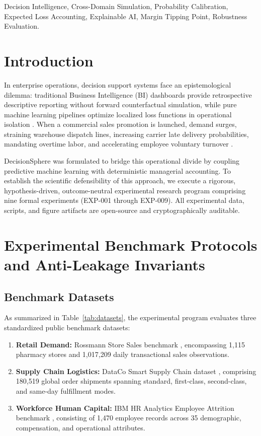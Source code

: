 \documentclass[10pt,conference]{IEEEtran}
\begin{document}
\begin{IEEEkeywords}
Decision Intelligence, Cross-Domain Simulation, Probability Calibration, Expected Loss Accounting, Explainable AI, Margin Tipping Point, Robustness Evaluation.
\end{IEEEkeywords}

\section{Introduction}

In enterprise operations, decision support systems face an epistemological dilemma: traditional Business Intelligence (BI) dashboards provide retrospective descriptive reporting without forward counterfactual simulation, while pure machine learning pipelines optimize localized loss functions in operational isolation \cite{pratt2019decision}. When a commercial sales promotion is launched, demand surges, straining warehouse dispatch lines, increasing carrier late delivery probabilities, mandating overtime labor, and accelerating employee voluntary turnover \cite{lee1997bullwhip, maslach2001burnout}.

DecisionSphere was formulated to bridge this operational divide by coupling predictive machine learning with deterministic managerial accounting. To establish the scientific defensibility of this approach, we execute a rigorous, hypothesis-driven, outcome-neutral experimental research program comprising nine formal experiments (EXP-001 through EXP-009). All experimental data, scripts, and figure artifacts are open-source and cryptographically auditable.

\section{Experimental Benchmark Protocols and Anti-Leakage Invariants}

\subsection{Benchmark Datasets}
As summarized in Table~\ref{tab:datasets}, the experimental program evaluates three standardized public benchmark datasets:
\begin{enumerate}
    \item \textbf{Retail Demand:} Rossmann Store Sales benchmark \cite{rossmann2015kaggle}, encompassing 1,115 pharmacy stores and 1,017,209 daily transactional sales observations.
    \item \textbf{Supply Chain Logistics:} DataCo Smart Supply Chain dataset \cite{constante2019dataco}, comprising 180,519 global order shipments spanning standard, first-class, second-class, and same-day fulfillment modes.
    \item \textbf{Workforce Human Capital:} IBM HR Analytics Employee Attrition benchmark \cite{ibm2017attrition}, consisting of 1,470 employee records across 35 demographic, compensation, and operational attributes.
\end{enumerate}
\end{document}
